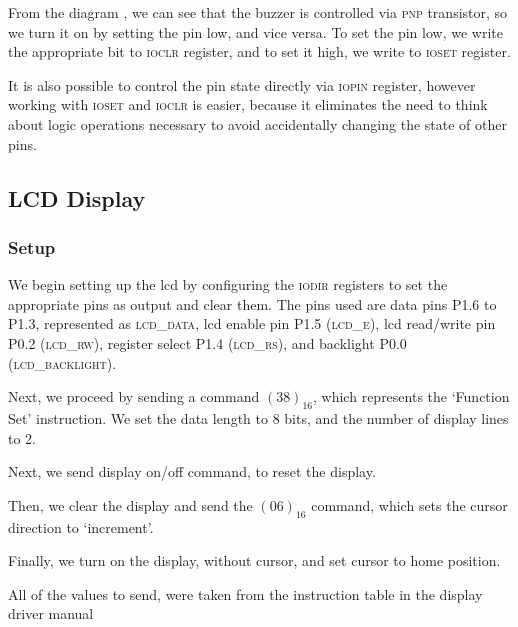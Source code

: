 \documentclass[10pt]{article}
\begin{document}
From the diagram \cite[p.9]{eduboard-man}, we can see that the buzzer is controlled via \textsc{pnp} transistor, so we turn it on by setting the pin low, and vice versa.
To set the pin low, we write the appropriate bit to \textsc{ioclr} register, and to set it high, we write to \textsc{ioset} register.

It is also possible to control the pin state directly via \textsc{iopin} register, however working with \textsc{ioset} and \textsc{ioclr} is easier, because it eliminates the need to think about logic operations necessary to avoid accidentally changing the state of other pins.

\subsection{LCD Display}
\subsubsection{Setup}
We begin setting up the lcd by configuring the \textsc{iodir} registers to set the appropriate pins as output and clear them.
The pins used are data pins {\small P1.6} to {\small P1.3}, represented as \textsc{lcd\_data}, lcd enable pin {\small P1.5} (\textsc{lcd\_e}), lcd \mbox{read/write} pin {\small P0.2} (\textsc{lcd\_rw}), register select {\small P1.4} (\textsc{lcd\_rs}), and backlight {\small P0.0} (\textsc{lcd\_backlight}).

Next, we proceed by sending a command $(38)_{16}$, which represents the `Function Set' instruction.
We set the data length to 8 bits, and the number of display lines to 2.

Next, we send display on/off command, to reset the display.

Then, we clear the display and send the $(06)_{16}$ command, which sets the cursor direction to `increment'.

Finally, we turn on the display, without cursor, and set cursor to home position.

All of the values to send, were taken from the instruction table in the display driver manual \cite[p.24]{display-man}
\end{document}

